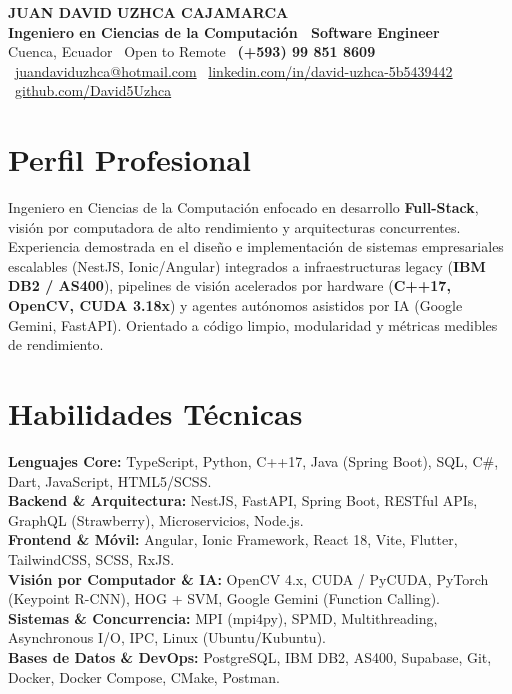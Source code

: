 \documentclass[9.5pt, letterpaper]{article}
\begin{document}
\begin{center}
    {\fontsize{19}{22}\selectfont \textbf{\color{navy} JUAN DAVID UZHCA CAJAMARCA}}\\[2pt]
    {\fontsize{10.5}{12}\selectfont \textbf{Ingeniero en Ciencias de la Computación \textbar\ Software Engineer}}\\[2.5pt]
    \footnotesize
    Cuenca, Ecuador \textbar\ Open to Remote \textbar\ 
    \textbf{(+593) 99 851 8609} \textbar\ 
    \href{mailto:juandaviduzhca@hotmail.com}{juandaviduzhca@hotmail.com} \textbar\ 
    \href{https://linkedin.com/in/david-uzhca-5b5439442}{linkedin.com/in/david-uzhca-5b5439442} \textbar\ 
    \href{https://github.com/David5Uzhca}{github.com/David5Uzhca}
\end{center}

\vspace{-4pt}

\section{Perfil Profesional}
\footnotesize
Ingeniero en Ciencias de la Computación enfocado en desarrollo \textbf{Full-Stack}, visión por computadora de alto rendimiento y arquitecturas concurrentes. Experiencia demostrada en el diseño e implementación de sistemas empresariales escalables (NestJS, Ionic/Angular) integrados a infraestructuras legacy (\textbf{IBM DB2 / AS400}), pipelines de visión acelerados por hardware (\textbf{C++17, OpenCV, CUDA 3.18x}) y agentes autónomos asistidos por IA (Google Gemini, FastAPI). Orientado a código limpio, modularidad y métricas medibles de rendimiento.

\section{Habilidades Técnicas}
\footnotesize
\textbf{Lenguajes Core:} TypeScript, Python, C++17, Java (Spring Boot), SQL, C\#, Dart, JavaScript, HTML5/SCSS.\\
\textbf{Backend \& Arquitectura:} NestJS, FastAPI, Spring Boot, RESTful APIs, GraphQL (Strawberry), Microservicios, Node.js.\\
\textbf{Frontend \& Móvil:} Angular, Ionic Framework, React 18, Vite, Flutter, TailwindCSS, SCSS, RxJS.\\
\textbf{Visión por Computador \& IA:} OpenCV 4.x, CUDA / PyCUDA, PyTorch (Keypoint R-CNN), HOG + SVM, Google Gemini (Function Calling).\\
\textbf{Sistemas \& Concurrencia:} MPI (mpi4py), SPMD, Multithreading, Asynchronous I/O, IPC, Linux (Ubuntu/Kubuntu).\\
\textbf{Bases de Datos \& DevOps:} PostgreSQL, IBM DB2, AS400, Supabase, Git, Docker, Docker Compose, CMake, Postman.
\end{document}
